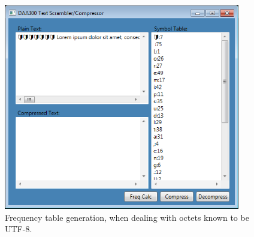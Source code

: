 \documentclass[a4paper,titlepage,12pt]{article}
\begin{document}
\begin{center}
\begin{figure}[b]
	\begin{center}
		\includegraphics[height=9cm]{FTC.png}
	\end{center}
	\caption{
		Frequency table generation, when dealing with octets known to
		be UTF-8.
	}
	\label{FTC}
\end{figure}
\end{center}
\end{document}
